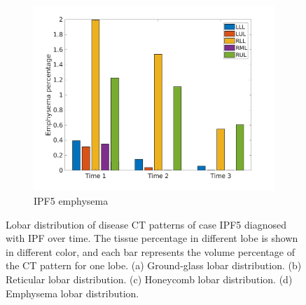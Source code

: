 \begin{figure}[H]
\begin{subfigure}{.46\linewidth}
  \includegraphics[width=\linewidth,trim={{.0\wd0} {.0\wd0} {.0\wd0} {.0\wd0}},clip]{Appendix/Image_AppexA/LobarDistribution/IPF5EmphysemaLobarRegionDiseaseDistributionOverTime.jpg}
  \caption{IPF5 emphysema}
  \label{fig:IPF5LobarRegionDiseaseDistributionOverTime-d}
\end{subfigure}
\caption{Lobar distribution of disease CT patterns of case IPF5 diagnosed with IPF over time. The tissue percentage in different lobe is shown in different color, and each bar represents the volume percentage of the CT pattern for one lobe. (a) Ground-glass lobar distribution. (b) Reticular lobar distribution. (c) Honeycomb lobar distribution. (d) Emphysema lobar distribution.}
\label{fig:IPF5LobarRegionDiseaseDistributionOverTime}
\end{figure}

